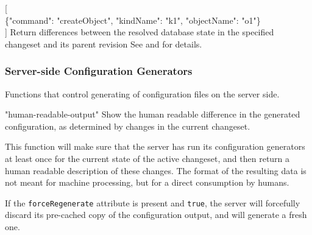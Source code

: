 \documentclass[deska]{subfiles}
\begin{document}
    {[ \\
    \{"command": "createObject", "kindName": "k1", "objectName": "o1"\} \\
    ]}
    {Return differences between the resolved database state in the specified changeset and its parent revision}
    {See  and  for details.}

\subsubsection{Server-side Configuration Generators}
\label{sec:api-group-conf-generators}

Functions that control generating of configuration files on the server side.

    {"human-readable-output"}
    {Show the human readable difference in the generated configuration, as determined by changes in the current
    changeset.}
    {This function will make sure that the server has run its configuration generators at least once for the current
    state of the active changeset, and then return a human readable description of these changes.  The format of the
    resulting data is not meant for machine processing, but for a direct consumption by humans.

    If the {\tt forceRegenerate} attribute is present and {\tt true}, the server will forcefully discard its pre-cached
    copy of the configuration output, and will generate a fresh one.}
\end{document}

